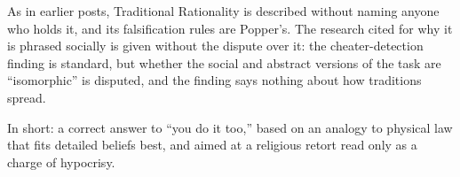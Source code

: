 \begin{afterword}
As in earlier posts, Traditional Rationality is described without naming anyone who holds it, and its falsification rules are Popper's. The research cited for why it is phrased socially is given without the dispute over it: the cheater-detection finding is standard, but whether the social and abstract versions of the task are ``isomorphic'' is disputed, and the finding says nothing about how traditions spread.

In short: a correct answer to ``you do it too,'' based on an analogy to physical law that fits detailed beliefs best, and aimed at a religious retort read only as a charge of hypocrisy.
\end{afterword}
